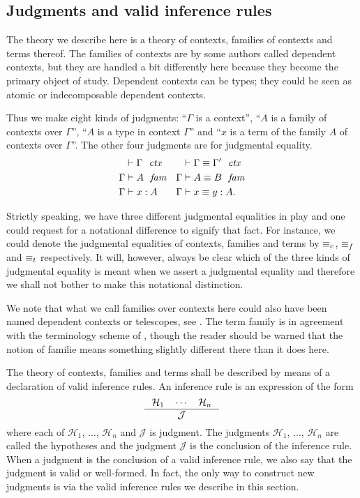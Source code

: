 \subsection{Judgments and valid inference rules}\label{judgments}
The theory we describe here is a theory of contexts, families of
contexts and terms thereof. The families of contexts are by some authors called
dependent contexts, but they are handled a bit differently here because they
become the primary object of study. Dependent contexts can be types; they could
be seen as atomic or indecomposable dependent contexts.

Thus we make eight kinds of judgments: ``$\Gamma$ is a context'',
``$A$ is a family of contexts over $\Gamma$'', ``$A$ is a type in context $\Gamma$''
and ``$x$ is a term of the family $A$ of contexts over $\Gamma$''. The other four
judgments are for judgmental equality.
\begin{align*}
\jctx*{\Gamma} 
& \jctxeq*{\Gamma}{\Gamma'}
  \\
\jfam*{\Gamma}{A} 
& \jfameq*{\Gamma}{A}{B}
  \\
\jterm*{\Gamma}{A}{x} 
& \jtermeq*{\Gamma}{A}{x}{y}.
\end{align*}

Strictly speaking, we have three different judgmental equalities in play and one
could request for a notational difference to signify that fact. For instance,
we could denote the judgmental equalities of contexts, families and terms by
$\equiv_c$, $\equiv_f$ and $\equiv_t$ respectively. It will, however, always be
clear which of the three kinds of judgmental equality is meant when we assert
a judgmental equality and therefore we shall not bother to make this notational
distinction.

We note that what we call families over contexts
here could also have been named dependent contexts or telescopes, see
\cite{deBruijn1991,hofmann1995extensional}. The term family is in agreement
with the terminology scheme of \cite{TheBook}, though the reader should be
warned that the notion of familie means something slightly different there than
it does here.

The theory of contexts, families and terms shall be described by means of a
declaration of valid inference rules. An inference rule is an expression of the
form
\begin{equation*}
\inference{\mathcal{H}_1\quad\cdots\quad\mathcal{H}_n}{\mathcal{J}}
\end{equation*}
where each of $\mathcal{H}_1$, ..., $\mathcal{H}_n$ and $\mathcal{J}$ is 
judgment. The judgments $\mathcal{H}_1$, ..., $\mathcal{H}_n$ are called the
hypotheses and the judgment $\mathcal{J}$ is the conclusion of the inference
rule. When a judgment is the conclusion of a valid inference rule, we also say
that the judgment is valid or well-formed. In fact, the only way to construct
new judgments is via the valid inference rules we describe in this section.

